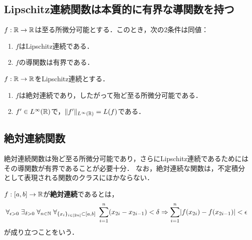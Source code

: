 \documentclass[uplatex,dvipdfmx]{jsreport}
\begin{document}
\subsection{Lipschitz連続関数は本質的に有界な導関数を持つ}

\begin{proposition}[至る所微分可能な関数がLipschitz連続であることの特徴付け]
    $f:\mathbb{R}\to\mathbb{R}$は至る所微分可能とする．このとき，次の2条件は同値：
    \begin{enumerate}
        \item $f$はLipschitz連続である．
        \item $f$の導関数は有界である．
    \end{enumerate}
\end{proposition}

\begin{proposition}[Lipschitz連続関数の導関数はLipschitz定数をノルムとして本質的有界]
    $f:\mathbb{R}\to\mathbb{R}$をLipschitz連続とする．
    \begin{enumerate}
        \item $f$は絶対連続であり，したがって殆ど至る所微分可能である．
        \item $f'\in L^\infty(\mathbb{R})$で，$\|f'\|_{L^\infty(\mathbb{R})}=L(f)$である．
    \end{enumerate}
\end{proposition}

\subsection{絶対連続関数}

\begin{tcolorbox}[colframe=ForestGreen, colback=ForestGreen!10!white,breakable,colbacktitle=ForestGreen!40!white,coltitle=black,fonttitle=\bfseries\sffamily,
title=]
    絶対連続関数は殆ど至る所微分可能であり，さらにLipschitz連続であるためにはその導関数が有界であることが必要十分．
    なお，絶対連続な関数は，不定積分として表現される関数のクラスにほかならない．
\end{tcolorbox}

\begin{definition}
    $f:[a,b]\to\mathbb{R}$が\textbf{絶対連続}であるとは，
    \[\forall_{\epsilon>0}\;\exists_{\delta>0}\;\forall_{n\in\mathbb{N}}\;\forall_{\{x_i\}_{i\in[2n]}\subset [a,b]}\;\sum_{i=1}^n(x_{2i}-x_{2i-1})<\delta\Rightarrow\sum_{i=1}^n\lvert f(x_{2i})-f(x_{2i-1})\rvert<\epsilon\]
    が成り立つことをいう．
\end{definition}
\end{document}
